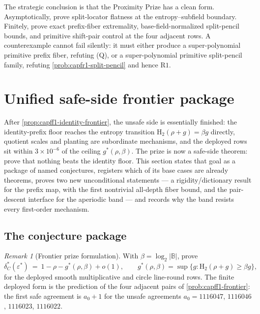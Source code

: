 \documentclass[11pt]{article}
\theoremstyle{definition}
\theoremstyle{remark}
\newtheorem{remark}[remark]{Remark}
\newcommand{\B}{\mathbb{B}}
\newcommand{\Hb}{\mathrm{H}_2}
\providecommand{\Rone}{\mathrm{R1}}
\begin{document}
The strategic conclusion is that the Proximity Prize has a clean form.  Asymptotically, prove split-locator flatness at the entropy--subfield boundary.  Finitely, prove exact prefix-fiber extremality, base-field-normalized split-pencil bounds, and primitive shift-pair control at the four adjacent rows.  A counterexample cannot fail silently: it must either produce a super-polynomial primitive prefix fiber, refuting \textup{(Q)}, or a super-polynomial primitive split-pencil family, refuting \cref{prob:capfr1-split-pencil} and hence \(\Rone\).


\section{Unified safe-side frontier package}\label{sec:capfp-prize}

After \cref{prop:capff1-identity-frontier}, the unsafe side is essentially finished: the identity-prefix floor reaches the entropy transition $\Hb(\rho+g)=\beta g$ directly, quotient scales and planting are subordinate mechanisms, and the deployed rows sit within $3\times10^{-6}$ of the ceiling $g^*(\rho,\beta)$.  The prize is now a safe-side theorem: prove that nothing beats the identity floor.  This section states that goal as a package of named conjectures, registers which of its base cases are already theorems, proves two new unconditional statements --- a rigidity/dictionary result for the prefix map, with the first nontrivial all-depth fiber bound, and the pair-descent interface for the aperiodic band --- and records why the band resists every first-order mechanism.

\subsection{The conjecture package}

\begin{remark}[Frontier prize formulation]\label{prob:capfp-F}
With $\beta=\log_2|\B|$, prove
\[
        \delta^*_C(\varepsilon^*)\ =\ 1-\rho-g^*(\rho,\beta)+o(1),
        \qquad
        g^*(\rho,\beta)=\sup\{g:\Hb(\rho+g)\ge\beta g\},
\]
for the deployed smooth multiplicative and circle line-round rows.  The finite deployed form is the prediction of the four adjacent pairs of \cref{prob:capff1-frontier}: the first safe agreement is $a_0+1$ for the unsafe agreements $a_0=1116047$, $1116046$, $1116023$, $1116022$.
\end{remark}
\end{document}
